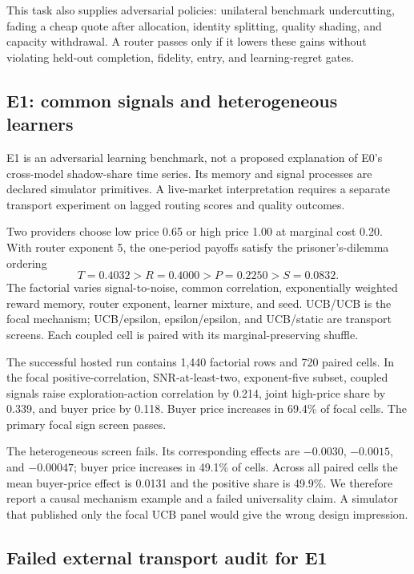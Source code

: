 \documentclass[10pt]{article}
\newcommand{\1}{\mathbf 1}
\begin{document}
This task also supplies adversarial policies: unilateral benchmark undercutting,
fading a cheap quote after allocation, identity splitting, quality shading, and
capacity withdrawal.  A router passes only if it lowers these gains without
violating held-out completion, fidelity, entry, and learning-regret gates.

\subsection{E1: common signals and heterogeneous learners}

E1 is an adversarial learning benchmark, not a proposed explanation of E0's
cross-model shadow-share time series.  Its memory and signal processes are
declared simulator primitives.  A live-market interpretation requires a
separate transport experiment on lagged routing scores and quality outcomes.

Two providers choose low price 0.65 or high price 1.00 at marginal cost 0.20.
With router exponent 5, the one-period payoffs satisfy the prisoner's-dilemma
ordering
\[
T=0.4032>R=0.4000>P=0.2250>S=0.0832.
\]
The factorial varies signal-to-noise, common correlation, exponentially weighted
reward memory, router exponent, learner mixture, and seed.  UCB/UCB is the focal
mechanism; UCB/epsilon, epsilon/epsilon, and UCB/static are transport screens.
Each coupled cell is paired with its marginal-preserving shuffle.

The successful hosted run contains 1,440 factorial rows and 720 paired cells.  In
the focal positive-correlation, SNR-at-least-two, exponent-five subset, coupled
signals raise exploration-action correlation by 0.214, joint high-price share by
0.339, and buyer price by 0.118.  Buyer price increases in 69.4\% of focal cells.
The primary focal sign screen passes.

The heterogeneous screen fails.  Its corresponding effects are $-0.0030$,
$-0.0015$, and $-0.00047$; buyer price increases in 49.1\% of cells.  Across all
paired cells the mean buyer-price effect is 0.0131 and the positive share is
49.9\%.  We therefore report a causal mechanism example and a failed universality
claim.  A simulator that published only the focal UCB panel would give the wrong
design impression.

\subsection{Failed external transport audit for E1}
\end{document}

